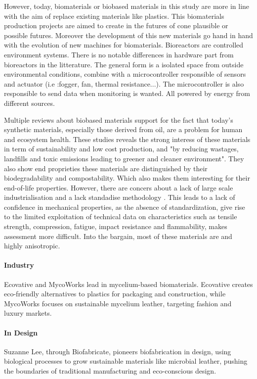 However, today, biomaterials or biobased materials in this study are more in line with the aim of replace existing materials like plastics.
This biomaterials production projects are aimed to create in the futures of cone plausible or possible futures. 
Moreover the development of this new materials go hand in hand with the evolution of new machines for biomaterials. Bioreactors are controlled environment systems. There is no notable differences in hardware part from bioreactors in the litterature. The general form is a isolated space from outside environmental conditions, 
combine with a microcontroller responsible of sensors and actuator (i.e :fogger, fan, thermal resistance...). The microcontroller is also responsible to send data when monitoring is wanted. All powered by energy from different sources. 

Multiple reviews\cite{cottet2020biobased}\cite{vinod2020renewable}\cite{hairon2022bio} about biobased materials support for the fact that today's synthetic materials, especially those derived from oil, are a problem for human and ecosystem health.
These studies reveals the strong interess of these materials in term of sustainability and low cost production, and "by reducing wastages, landfills
and toxic emissions leading to greener and cleaner environment". They also show end proprieties these materials are distinguished by their biodegradability and compostability. Which also makes them interesting for their end-of-life properties. 
However, there are concers about a lack of large scale industrialisation and a lack standadise methodology \cite{andrew2022sustainable}. This leads to a lack of confidence in mechanical properties, as the absence of standardization, give rise to the limited exploitation of technical data on characteristics such as tensile strength, compression, fatigue, impact resistance and flammability, makes assessment more difficult.   
Into the bargain, most of these materials are and highly anisotropic.

\paragraph[short]{Industry} 
Ecovative and MycoWorks lead in mycelium-based biomaterials. Ecovative creates eco-friendly alternatives to plastics for packaging and construction, while MycoWorks focuses on sustainable mycelium leather, targeting fashion and luxury markets.
\paragraph[short]{In Design} 
Suzanne Lee, through Biofabricate, pioneers biofabrication in design, using biological processes to grow sustainable materials like microbial leather, pushing the boundaries of traditional manufacturing and eco-conscious design.



